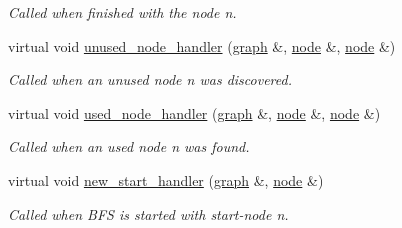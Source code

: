 \begin{DoxyCompactItemize}
\begin{DoxyCompactList}\small\item\em Called when finished with the node {\itshape n}. \end{DoxyCompactList}\item 
virtual void \mbox{\hyperlink{classbfs_a6e31b8d063a85d92f2b44ff41d2050aa}{unused\+\_\+node\+\_\+handler}} (\mbox{\hyperlink{classgraph}{graph}} \&, \mbox{\hyperlink{classnode}{node}} \&, \mbox{\hyperlink{classnode}{node}} \&)
\begin{DoxyCompactList}\small\item\em Called when an unused node {\itshape n} was discovered. \end{DoxyCompactList}\item 
virtual void \mbox{\hyperlink{classbfs_a5514649937b2e27f0bfc41ba868cb156}{used\+\_\+node\+\_\+handler}} (\mbox{\hyperlink{classgraph}{graph}} \&, \mbox{\hyperlink{classnode}{node}} \&, \mbox{\hyperlink{classnode}{node}} \&)
\begin{DoxyCompactList}\small\item\em Called when an used node {\itshape n} was found. \end{DoxyCompactList}\item 
virtual void \mbox{\hyperlink{classbfs_ab89a3d1cb36b20a86837b0345063e4b1}{new\+\_\+start\+\_\+handler}} (\mbox{\hyperlink{classgraph}{graph}} \&, \mbox{\hyperlink{classnode}{node}} \&)
\begin{DoxyCompactList}\small\item\em Called when B\+FS is started with start-\/node {\itshape n}. \end{DoxyCompactList}\end{DoxyCompactItemize}
